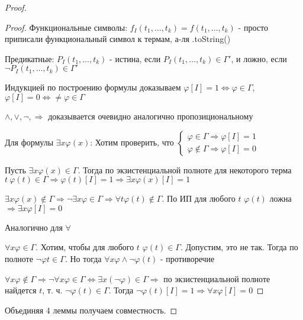 \begin{proof}
\begin{proof}
    Функциональные символы: $f_I(t_1, \dots, t_k) = f(t_1, \dots, t_k)$ - просто приписали функциональный символ к термам, а-ля .toString()

    Предикатные: $P_I(t_1, \dots, t_k)$ - истина, если $P_I(t_1, \dots, t_k) \in \Gamma'$, и ложно, если $\neg P_I(t_1, \dots, t_k) \in \Gamma'$

    Индукцией по построению формулы доказываем $\varphi[I] = 1 \Leftrightarrow \varphi \in \Gamma$, $\varphi[I] = 0 \Leftrightarrow \neq \varphi \in \Gamma$

    $\land, \lor, \neg, \Rightarrow$ доказывается очевидно аналогично пропозициональному

    Для формулы $\exists x \varphi(x)$: 
    Хотим проверить, что 
    $\begin{cases}
        \varphi \in \Gamma \Rightarrow \varphi[I] = 1\\
        \varphi \notin \Gamma \Rightarrow \varphi[I] = 0
    \end{cases}$

    Пусть $\exists x \varphi(x) \in \Gamma$. Тогда по экзистенциальной полноте для некоторого терма $t\ \varphi(t) \in \Gamma \Rightarrow \varphi(t)[I] = 1 \Rightarrow \exists x \varphi(x)[I] = 1$

    $\exists x \varphi(x) \notin \Gamma \Rightarrow \neg \exists x \varphi \in \Gamma \Rightarrow \forall t \varphi(t) \notin \Gamma$. По ИП для любого $t$ $\varphi(t)$ ложна
    $\Rightarrow \exists x \varphi[I] = 0$

    Аналогично для $\forall$

    $\forall x \varphi \in \Gamma$. Хотим, чтобы для любого $t$ $\varphi(t) \in \Gamma$.
    Допустим, это не так. Тогда по полноте $\neg \varphi t \in \Gamma$. Но тогда $\forall x \varphi \land \neg \varphi(t)$ - противоречие 

    $\forall x \varphi \notin \Gamma \Rightarrow \neg \forall x \varphi \in \Gamma \Leftrightarrow \exists x(\neg \varphi) \in \Gamma \Rightarrow$ по экзистенциальной полноте
    найдется $t$, т. ч. $\neg \varphi(t) \in \Gamma$. Тогда $\neg \varphi(t)[I] = 1 \Rightarrow \forall x \varphi[I] = 0$
\end{proof}

Объединяя 4 леммы получаем совместность.

\end{proof}